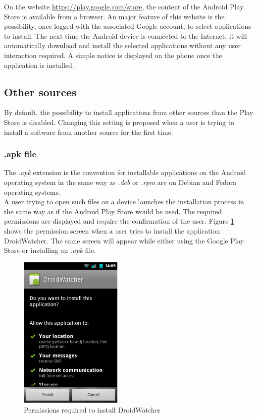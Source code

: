 On the website \url{https://play.google.com/store}, the content of the Android Play Store is available from a browser.
An major feature of this website is the possibility, once logged with the associated Google account, to select applications to install.
The next time the Android device is connected to the Internet, it will automatically download and install the selected applications without any user interaction required.
A simple notice is displayed on the phone once the application is installed.\\


\subsection{Other sources}
By default, the possibility to install applications from other sources than the Play Store is disabled.
Changing this setting is proposed when a user is trying to install a software from another source for the first time.

\subsubsection{.apk file}
The \emph{.apk} extension is the convention for installable applications on the Android operating system in the same way as \emph{.deb} or \emph{.rpm} are on Debian and Fedora operating systems.\\

A user trying to open such files on a device launches the installation process in the same way as if the Android Play Store would be used.
The required permissions are displayed and require the confirmation of the user.
Figure \ref{fig:perm-dw} shows the permission screen when a user tries to install the application DroidWatcher.
The same screen will appear while either using the Google Play Store or installing an \emph{.apk} file.\\

\begin{figure}[h]
  \centering
  \includegraphics[width=5cm]{images/permissions.png}
  \caption{Permissions required to install DroidWatcher}
  \label{fig:perm-dw}
\end{figure}

